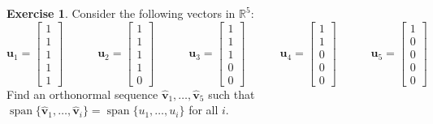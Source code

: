 \documentclass{amsart}
\newcommand{\R}         {{\mathbb{R}}}
\newcommand{\spn}       {\operatorname{span}}
\newcommand{\bsm}       {\left[\begin{smallmatrix}}
\newcommand{\esm}       {\end{smallmatrix}\right]}
\newcommand{\vu}        {\mathbf{u}}
\newcommand{\hv}        {\widehat{\mathbf{v}}}
\renewcommand{\:}       {\colon}
\theoremstyle{definition}
\newtheorem{exercise}{Exercise}[section]
\begin{document}
\begin{exercise}
 Consider the following vectors in $\R^5$:
 \[
  \vu_1 = \bsm 1\\ 1\\ 1\\ 1\\ 1\esm \hspace{3em}
  \vu_2 = \bsm 1\\ 1\\ 1\\ 1\\ 0\esm \hspace{3em}
  \vu_3 = \bsm 1\\ 1\\ 1\\ 0\\ 0\esm \hspace{3em}
  \vu_4 = \bsm 1\\ 1\\ 0\\ 0\\ 0\esm \hspace{3em}
  \vu_5 = \bsm 1\\ 0\\ 0\\ 0\\ 0\esm
 \]
 Find an orthonormal sequence $\hv_1,\dotsc,\hv_5$ such that
 $\spn\{\hv_1,\dotsc,\hv_i\}=\spn\{u_1,\dotsc,u_i\}$ for all $i$.
\end{exercise}
\end{document}

